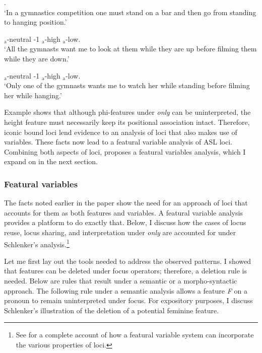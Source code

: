 \documentclass[output=paper,
modfonts
]{langscibook}
\begin{document}
\begin{exe}  \label{ex:irani:72}
		\ex {}.\\
		`In a gymnastics competition one must stand on a bar and then go from standing to hanging position.'
	\begin{xlist}	
		\ex  {} $_\text{a}$-{neutral}  -1 $_\text{a}$-{high}  $_\text{a}$-{low}.\\
		`All the gymnasts want me to look at them while they are up before filming them while they are down.'\newpage
		
		\ex  {} $_\text{a}$-{neutral}  -1 $_\text{a}$-{high}   $_\text{a}$-{low}. \\
		`Only one of the gymnasts wants me to watch her while standing before filming her while hanging.' \citep[1081]{Schlenker2014}
	\end{xlist}     
\end{exe}

Example  shows that although phi-features under \textit{only} can be uninterpreted, the height feature must necessarily keep its positional association intact. Therefore, iconic bound loci lend evidence to an analysis of loci that also makes use of variables. These facts now lead to a featural variable analysis of ASL loci. Combining both aspects of loci, \citet{Schlenker2014} proposes a featural variables analysis, which I expand on in the next section. 

\subsubsection{Featural variables}

The facts noted earlier in the paper show the need for an approach of loci that accounts for them as both features and variables. A featural variable analysis \citep{Schlenker2014} provides a platform to do exactly that. Below, I discuss how the cases of locus reuse, locus sharing, and interpretation under \textit{only} are accounted for under Schlenker's analysis.\footnote{See \citet{Schlenker2014} for a complete account of how a featural variable system can incorporate the various properties of loci.}  

Let me first lay out the tools needed to address the observed patterns. I showed that features can be deleted under focus operators; therefore, a deletion rule is needed. Below are rules that result under a semantic or a morpho-syntactic approach. The following rule under a semantic analysis allows a feature \textit{F} on a pronoun to remain uninterpreted under focus. For expository purposes, I discuss Schlenker's illustration of the deletion of a potential feminine feature.  
\end{document}
